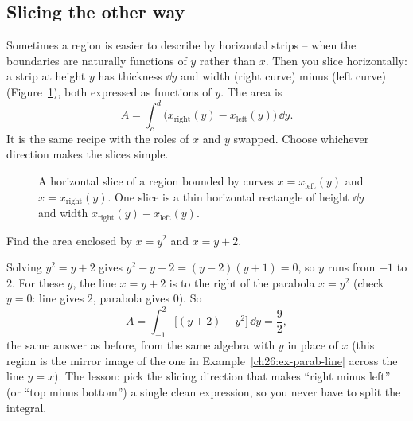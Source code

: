 \subsection{Slicing the other way}

Sometimes a region is easier to describe by horizontal strips -- when the
boundaries are naturally functions of $y$ rather than $x$. Then you slice
horizontally: a strip at height $y$ has thickness $\dd y$ and width
(right curve) minus (left curve) (Figure~\ref{ch26:fig-horiz-slice}), both expressed as functions of $y$. The area is
\[
  A = \int_c^d \bigl(x_{\text{right}}(y) - x_{\text{left}}(y)\bigr)\,\dd y.
\]
It is the same recipe with the roles of $x$ and $y$ swapped. Choose whichever
direction makes the slices simple.

\begin{figure}[H]
\centering
{}
\caption{A horizontal slice of a region bounded by curves $x = x_{\text{left}}(y)$ and $x = x_{\text{right}}(y)$. One slice is a thin horizontal rectangle of height $\dd y$ and width $x_{\text{right}}(y) - x_{\text{left}}(y)$.}
\label{ch26:fig-horiz-slice}
\end{figure}

\begin{example}
\label{ch26:ex-horiz}
Find the area enclosed by $x = y^2$ and $x = y+2$.

Solving $y^2 = y+2$ gives $y^2-y-2 = (y-2)(y+1) = 0$, so $y$ runs from $-1$ to
$2$. For these $y$, the line $x=y+2$ is to the right of the parabola $x=y^2$
(check $y=0$: line gives $2$, parabola gives $0$). So
\[
  A = \int_{-1}^{2}\bigl[(y+2)-y^2\bigr]\,\dd y = \frac{9}{2},
\]
the same answer as before, from the same algebra with $y$ in place of $x$ (this
region is the mirror image of the one in Example~\ref{ch26:ex-parab-line} across
the line $y=x$). The lesson: pick the
slicing direction that makes ``right minus left'' (or ``top minus bottom'') a
single clean expression, so you never have to split the integral.
\end{example}

